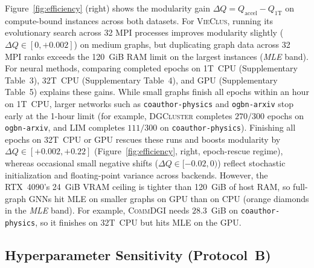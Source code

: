 \documentclass[11pt,a4paper]{article}
\begin{document}
Figure~\ref{fig:efficiency} (right) shows the modularity gain $\Delta Q = Q_{\text{accel}} - Q_{1\text{T}}$ on compute-bound instances across both datasets. For \textsc{VieClus}, running its evolutionary search across 32 MPI processes improves modularity slightly ($\Delta Q \in [0, +0.002]$) on medium graphs, but duplicating graph data across 32 MPI ranks exceeds the 120~GiB RAM limit on the largest instances (\emph{MLE} band). For neural methods, comparing completed epochs on 1T~CPU (Supplementary Table~3), 32T~CPU (Supplementary Table~4), and GPU (Supplementary Table~5) explains these gains. While small graphs finish all epochs within an hour on 1T~CPU, larger networks such as \texttt{coauthor-physics} and \texttt{ogbn-arxiv} stop early at the 1-hour limit (for example, \textsc{DGCluster} completes $270/300$ epochs on \texttt{ogbn-arxiv}, and \textsc{LIM} completes $111/300$ on \texttt{coauthor-physics}). Finishing all epochs on 32T~CPU or GPU rescues these runs and boosts modularity by $\Delta Q \in [+0.002, +0.22]$ (Figure~\ref{fig:efficiency}, right, epoch-rescue regime), whereas occasional small negative shifts ($\Delta Q \in [-0.02, 0)$) reflect stochastic initialization and floating-point variance across backends. However, the RTX~4090's 24~GiB VRAM ceiling is tighter than 120~GiB of host RAM, so full-graph GNNs hit \textsc{MLE} on smaller graphs on GPU than on CPU (orange diamonds in the \emph{MLE} band). For example, \textsc{CommDGI} needs $28.3$~GiB on \texttt{coauthor-physics}, so it finishes on 32T~CPU but hits \textsc{MLE} on the GPU.

\subsection{Hyperparameter Sensitivity (Protocol~B)}
\end{document}
